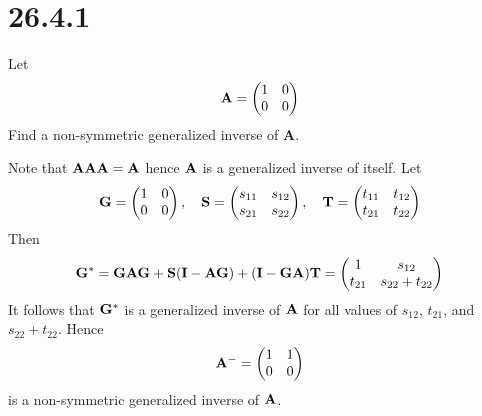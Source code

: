 \section*{26.4.1}
Let
$${\bf A}=\left(\begin{matrix}
1 & 0\cr
0 & 0
\end{matrix}\right)
$$
Find a non-symmetric generalized inverse of {\bf A}.

\bigskip
\noindent
Note that ${\bf{AAA}=A}$ hence ${\bf A}$ is a generalized inverse
of itself.
Let
$${\bf G}=\left(\begin{matrix}
1 & 0\cr
0 & 0
\end{matrix}\right),\quad
{\bf S}=\left(\begin{matrix}
s_{11} & s_{12}\cr
s_{21} & s_{22}
\end{matrix}\right),\quad
{\bf T}=\left(\begin{matrix}
t_{11} & t_{12}\cr
t_{21} & t_{22}
\end{matrix}\right)
$$
Then
$${\bf G}^*={\bf GAG}+{\bf S}({\bf I}-{\bf AG})
+({\bf I}-{\bf GA}){\bf T}
=\left(\begin{matrix}
1 & s_{12}\cr
t_{21} & s_{22}+t_{22}
\end{matrix}\right)
$$
It follows that ${\bf G}^*$ is a generalized inverse of $\bf A$ for
all values of $s_{12}$, $t_{21}$, and $s_{22}+t_{22}$.
Hence
$${\bf A}^{-{}}=\left(\begin{matrix}
1 & 1\cr
0 & 0
\end{matrix}\right)
$$
is a non-symmetric generalized inverse of $\bf A$.
